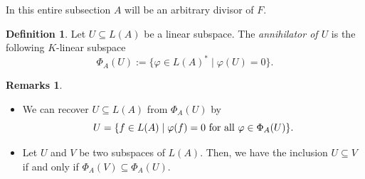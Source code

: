 \documentclass[12pt]{amsart}
\theoremstyle{definition}
\newtheorem{definition}[theorem]{Definition}
\newtheorem{remarks}[theorem]{Remarks}
\begin{document}
	In this entire subsection $A$ will be an arbitrary divisor of $F$. 
	
	\begin{definition}
		Let $U \subseteq L(A) $ be a linear subspace. The \textit{annihilator of $U$} is the following $K$-linear subspace
		$$\Phi_A(U) := \{ \varphi \in L(A)^\ast \mid \varphi(U) = 0 \}.$$ 
	\end{definition}
	
	\begin{remarks}~
		\begin{itemize}
			\item We can recover $U\subseteq L(A)$ from $\Phi_A(U)$ by 
			$$U = \{ f \in L(A) \mid \varphi(f) = 0 \textup{ for all } \varphi \in \Phi_A(U) \}.$$ 
			\item Let $U$ and $V$ be two subspaces of $L(A)$. Then, we have the inclusion $U \subseteq V$ if and only if  $\Phi_A(V) \subseteq \Phi_A(U)$. 
		\end{itemize}
	\end{remarks}
	
\end{document}
